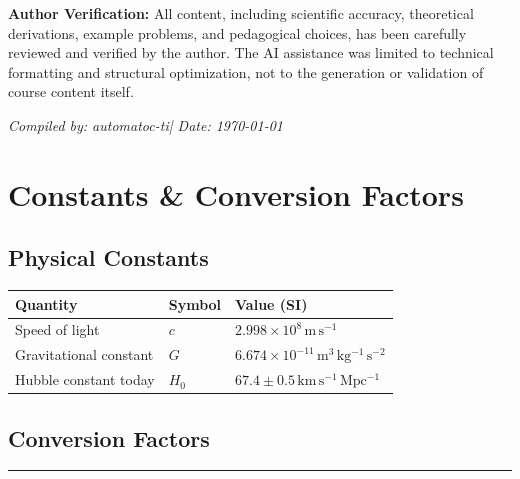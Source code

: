 \documentclass[12pt, a4paper, openright]{report}
\newcommand{\CompileDate}{\today}
\newcommand{\NoteAuthor}{automatoc-ti}
\begin{document}
\bigskip\noindent
\textbf{Author Verification:} All content, including scientific accuracy, theoretical derivations,
example problems, and pedagogical choices, has been carefully reviewed and verified by the author.
The AI assistance was limited to technical formatting and structural optimization, not to
the generation or validation of course content itself.

\bigskip\noindent
\textit{Compiled by: \NoteAuthor \quad | \quad Date: \CompileDate}

\clearpage

\chapter{Constants \& Conversion Factors}

\section{Physical Constants}

\begin{center}
\begin{tabular}{lll}
\toprule
\textbf{Quantity} & \textbf{Symbol} & \textbf{Value (SI)} \\
\midrule
Speed of light   & $c$ & $2.998 \times 10^8 \,\mathrm{m\,s^{-1}}$ \\
Gravitational constant & $G$ & $6.674 \times 10^{-11} \,\mathrm{m^3\,kg^{-1}\,s^{-2}}$ \\
Hubble constant today  & $H_0$ & $67.4 \pm 0.5 \,\mathrm{km\,s^{-1}\,Mpc^{-1}}$ \\
\bottomrule
\end{tabular}
\end{center}

\section{Conversion Factors}

\lipsum[27][1-4]   %

\clearpage


\begin{center}
  {\color{StarGold}\rule{0.4\textwidth}{0.5pt}}
\end{center}
\end{document}
